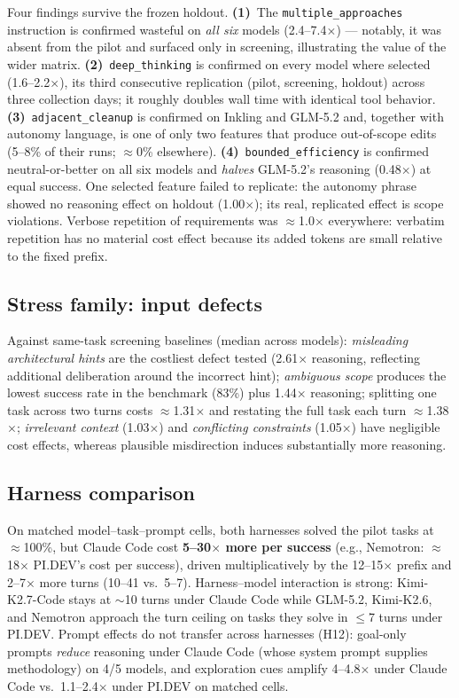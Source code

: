 \documentclass[11pt]{article}
\newcommand{\pidev}{PI.DEV}
\newcommand{\cc}{Claude Code}
\newcommand{\xd}{$\times$}
\begin{document}
Four findings survive the frozen holdout. \textbf{(1)}~The
\texttt{multiple\_approaches} instruction is confirmed wasteful on
\emph{all six} models (2.4--7.4\xd) --- notably, it was absent from the
pilot and surfaced only in screening, illustrating the value of the wider
matrix. \textbf{(2)}~\texttt{deep\_thinking} is confirmed on every model
where selected (1.6--2.2\xd), its third consecutive replication (pilot,
screening, holdout) across three collection days; it roughly doubles wall
time with identical tool behavior. \textbf{(3)}~\texttt{adjacent\_cleanup}
is confirmed on Inkling and GLM-5.2 and, together with autonomy language,
is one of only two features that produce out-of-scope edits (5--8\% of
their runs; $\approx$0\% elsewhere). \textbf{(4)}~\texttt{bounded\_efficiency}
is confirmed neutral-or-better on all six models and \emph{halves}
GLM-5.2's reasoning (0.48\xd) at equal success. One selected feature
failed to replicate: the autonomy phrase showed no reasoning effect on
holdout (1.00\xd); its real, replicated effect is scope violations.
Verbose repetition of requirements was $\approx$1.0\xd{} everywhere: verbatim repetition has no material cost effect because its added tokens are
small relative to the fixed prefix.

\subsection{Stress family: input defects}

Against same-task screening baselines (median across models):
\emph{misleading architectural hints} are the costliest defect tested
(2.61\xd{} reasoning, reflecting additional deliberation around the
incorrect hint);
\emph{ambiguous scope} produces the lowest success rate in the benchmark
(83\%) plus 1.44\xd{} reasoning; splitting one task across two turns costs
$\approx$1.31\xd{} and restating the full task each turn $\approx$1.38\xd;
\emph{irrelevant context} (1.03\xd) and \emph{conflicting constraints}
(1.05\xd) have negligible cost effects, whereas plausible misdirection
induces substantially more reasoning.

\subsection{Harness comparison}

On matched model--task--prompt cells, both harnesses solved the pilot
tasks at $\approx$100\%, but \cc{} cost \textbf{5--30\xd{} more per
success} (e.g., Nemotron: $\approx$18\xd{} \pidev's cost per success), driven multiplicatively by
the 12--15\xd{} prefix and 2--7\xd{} more turns (10--41 vs.\ 5--7).
Harness--model interaction is strong: Kimi-K2.7-Code stays at $\sim$10
turns under \cc{} while GLM-5.2, Kimi-K2.6, and Nemotron approach the turn ceiling on tasks they solve in $\leq$7 turns under \pidev.
Prompt effects do not transfer across harnesses (H12): goal-only prompts
\emph{reduce} reasoning under \cc{} (whose system prompt supplies
methodology) on 4/5 models, and exploration cues amplify 4--4.8\xd{} under
\cc{} vs.\ 1.1--2.4\xd{} under \pidev{} on matched cells.
\end{document}
